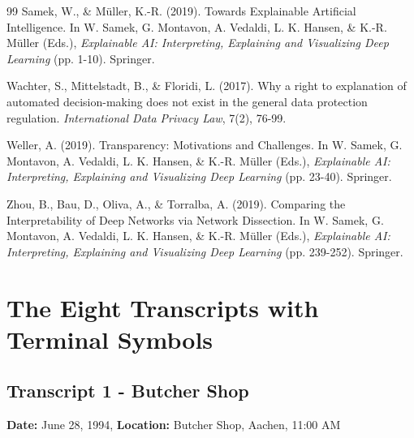 \documentclass[
  12pt,
  a4paper,
  oneside,
  titlepage
]{article}
\begin{document}
\begin{thebibliography}{99}
Samek, W., \& Müller, K.-R. (2019). Towards Explainable Artificial Intelligence. 
In W. Samek, G. Montavon, A. Vedaldi, L. K. Hansen, \& K.-R. Müller (Eds.), 
\textit{Explainable AI: Interpreting, Explaining and Visualizing Deep Learning} 
(pp. 1-10). Springer.

Wachter, S., Mittelstadt, B., \& Floridi, L. (2017). Why a right to explanation 
of automated decision-making does not exist in the general data protection 
regulation. \textit{International Data Privacy Law}, 7(2), 76-99.

Weller, A. (2019). Transparency: Motivations and Challenges. In W. Samek, 
G. Montavon, A. Vedaldi, L. K. Hansen, \& K.-R. Müller (Eds.), 
\textit{Explainable AI: Interpreting, Explaining and Visualizing Deep Learning} 
(pp. 23-40). Springer.

Zhou, B., Bau, D., Oliva, A., \& Torralba, A. (2019). Comparing the Interpretability 
of Deep Networks via Network Dissection. In W. Samek, G. Montavon, A. Vedaldi, 
L. K. Hansen, \& K.-R. Müller (Eds.), \textit{Explainable AI: Interpreting, 
Explaining and Visualizing Deep Learning} (pp. 239-252). Springer.

\end{thebibliography}

\newpage
\appendix
\section{The Eight Transcripts with Terminal Symbols}

\subsection{Transcript 1 - Butcher Shop}
\textbf{Date:} June 28, 1994, \textbf{Location:} Butcher Shop, Aachen, 11:00 AM
\end{document}
